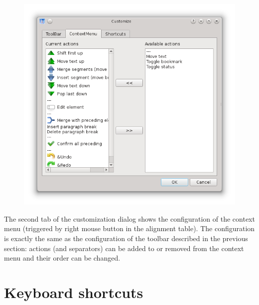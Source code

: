 \documentclass[a4paper,10pt,oneside]{book}
\begin{document}
\begin{figure}[htb]
 \includegraphics[width=\textwidth]{screenshots/customize_contextmenu.png}
\end{figure}

The second tab of the customization dialog shows the configuration of the context menu (triggered by right mouse button in the alignment table). The configuration is exactly the same as the configuration of the toolbar described in the previous section: actions (and separators) can be added to or removed from the context menu and their order can be changed.

\section{Keyboard shortcuts}\label{ch:detail:custom:shortcuts}
\end{document}
